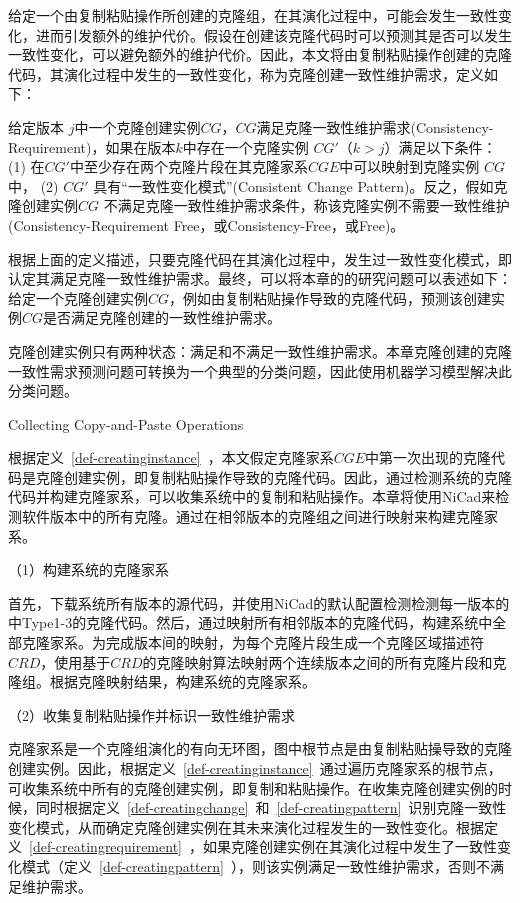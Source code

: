 给定一个由复制粘贴操作所创建的克隆组，在其演化过程中，可能会发生一致性变化，进而引发额外的维护代价。假设在创建该克隆代码时可以预测其是否可以发生一致性变化，可以避免额外的维护代价。因此，本文将由复制粘贴操作创建的克隆代码，其演化过程中发生的一致性变化，称为克隆创建一致性维护需求，定义如下：

\begin{definition}[创建一致性维护需求] 
 \label{def-creatingrequirement}
给定版本 $j$中一个克隆创建实例$CG$，$CG$满足克隆一致性维护需求(Consistency-Requirement)，如果在版本$k$中存在一个克隆实例 $CG'$（$k>j$）满足以下条件： (1) 在$CG'$中至少存在两个克隆片段在其克隆家系$CGE$中可以映射到克隆实例 $CG$中， (2) $CG'$ 具有“一致性变化模式”(Consistent Change Pattern)。反之，假如克隆创建实例$CG$ 不满足克隆一致性维护需求条件，称该克隆实例不需要一致性维护(Consistency-Requirement Free，或Consistency-Free，或Free)。
\end{definition}

根据上面的定义描述，只要克隆代码在其演化过程中，发生过一致性变化模式，即认定其满足克隆一致性维护需求。最终，可以将本章的的研究问题可以表述如下：给定一个克隆创建实例$CG$，例如由复制粘贴操作导致的克隆代码，预测该创建实例$CG$是否满足克隆创建的一致性维护需求。

克隆创建实例只有两种状态：满足和不满足一致性维护需求。本章克隆创建的克隆一致性需求预测问题可转换为一个典型的分类问题，因此使用机器学习模型解决此分类问题。

{Collecting Copy-and-Paste Operations}
\label{lab-checkcopied}

根据定义~\ref{def-creatinginstance}~，本文假定克隆家系$CGE$中第一次出现的克隆代码是克隆创建实例，即复制粘贴操作导致的克隆代码。因此，通过检测系统的克隆代码并构建克隆家系，可以收集系统中的复制和粘贴操作。本章将使用NiCad来检测软件版本中的所有克隆。通过在相邻版本的克隆组之间进行映射来构建克隆家系。

（1）构建系统的克隆家系

首先，下载系统所有版本的源代码，并使用NiCad的默认配置检测检测每一版本的中Type1-3的克隆代码。然后，通过映射所有相邻版本的克隆代码，构建系统中全部克隆家系。为完成版本间的映射，为每个克隆片段生成一个克隆区域描述符 $CRD$\cite{duala2010clone}，使用基于$CRD$的克隆映射算法映射两个连续版本之间的所有克隆片段和克隆组\cite{ci2013new}\cite{ci2013newD}。根据克隆映射结果，构建系统的克隆家系。

（2）收集复制粘贴操作并标识一致性维护需求

克隆家系是一个克隆组演化的有向无环图，图中根节点是由复制粘贴操导致的克隆创建实例。因此，根据定义~\ref{def-creatinginstance}~通过遍历克隆家系的根节点，可收集系统中所有的克隆创建实例，即复制和粘贴操作。在收集克隆创建实例的时候，同时根据定义~\ref{def-creatingchange}~和~\ref{def-creatingpattern}~识别克隆一致性变化模式，从而确定克隆创建实例在其未来演化过程发生的一致性变化。根据定义~\ref{def-creatingrequirement}~，如果克隆创建实例在其演化过程中发生了一致性变化模式（定义~\ref{def-creatingpattern}~），则该实例满足一致性维护需求，否则不满足维护需求。

